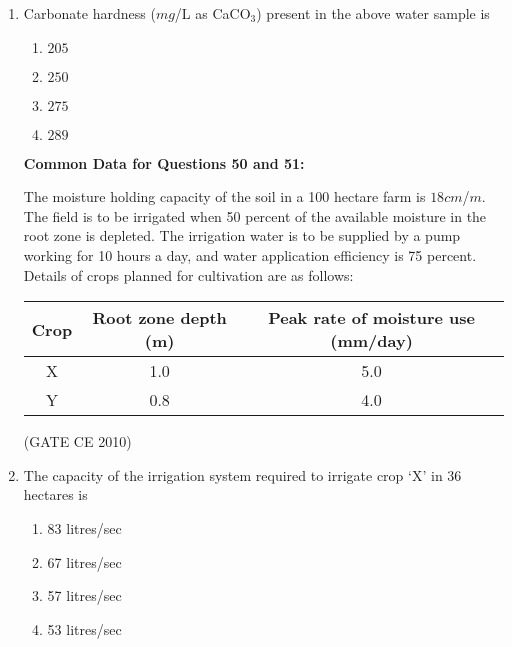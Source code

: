 \documentclass[journal]{IEEEtran}
\begin{document}
\begin{enumerate}
    
    \item Carbonate hardness ($mg$/L as CaCO$_3$) present in the above water sample is

    \begin{multicols}{4}
        \begin{enumerate}
            \item $205$
            \item $250$
            \item $275$
            \item $289$
        \end{enumerate}
    \end{multicols}

     \textbf{Common Data for Questions 50 and 51:}

    
    The moisture holding capacity of the soil in a 100 hectare farm is $18 cm$/$m$. The field is to be irrigated when 50 percent of the available moisture in the root zone is depleted. The irrigation water is to be supplied by a pump working for 10 hours a day, and water application efficiency is 75 percent. Details of crops planned for cultivation are as follows:

    \begin{table}[h!]
        \centering
        \begin{tabular}{|c|c|c|}
            \hline
            \textbf{Crop} & \textbf{Root zone depth (m)} & \textbf{Peak rate of moisture use (mm/day)} \\ \hline
            X & 1.0 & 5.0 \\ \hline
            Y & 0.8 & 4.0 \\ \hline
        \end{tabular}
    \end{table} \hfill (GATE CE 2010)

    
    \item The capacity of the irrigation system required to irrigate crop `X' in 36 hectares is

    \begin{multicols}{4}
        \begin{enumerate}
            \item 83 litres/sec
            \item 67 litres/sec
            \item 57 litres/sec
            \item 53 litres/sec
        \end{enumerate}
    \end{multicols}


\end{enumerate}
\end{document}
